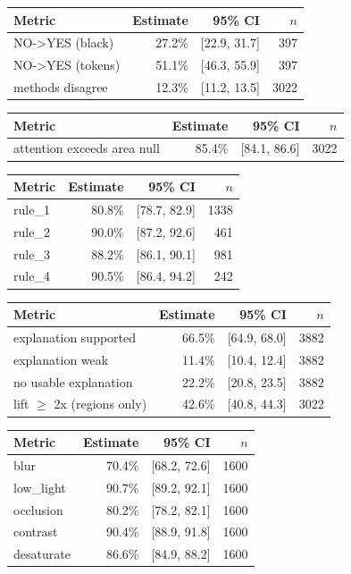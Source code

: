 \begin{tabular}{lrrr}
\toprule
Metric & Estimate & 95\% CI & $n$ \\
\midrule
NO->YES (black) & 27.2\% & [22.9, 31.7] & 397 \\
NO->YES (tokens) & 51.1\% & [46.3, 55.9] & 397 \\
methods disagree & 12.3\% & [11.2, 13.5] & 3022 \\
\bottomrule
\end{tabular}

\begin{tabular}{lrrr}
\toprule
Metric & Estimate & 95\% CI & $n$ \\
\midrule
attention exceeds area null & 85.4\% & [84.1, 86.6] & 3022 \\
\bottomrule
\end{tabular}

\begin{tabular}{lrrr}
\toprule
Metric & Estimate & 95\% CI & $n$ \\
\midrule
rule\_1 & 80.8\% & [78.7, 82.9] & 1338 \\
rule\_2 & 90.0\% & [87.2, 92.6] & 461 \\
rule\_3 & 88.2\% & [86.1, 90.1] & 981 \\
rule\_4 & 90.5\% & [86.4, 94.2] & 242 \\
\bottomrule
\end{tabular}

\begin{tabular}{lrrr}
\toprule
Metric & Estimate & 95\% CI & $n$ \\
\midrule
explanation supported & 66.5\% & [64.9, 68.0] & 3882 \\
explanation weak & 11.4\% & [10.4, 12.4] & 3882 \\
no usable explanation & 22.2\% & [20.8, 23.5] & 3882 \\
lift $\geq$ 2x (regions only) & 42.6\% & [40.8, 44.3] & 3022 \\
\bottomrule
\end{tabular}

\begin{tabular}{lrrr}
\toprule
Metric & Estimate & 95\% CI & $n$ \\
\midrule
blur & 70.4\% & [68.2, 72.6] & 1600 \\
low\_light & 90.7\% & [89.2, 92.1] & 1600 \\
occlusion & 80.2\% & [78.2, 82.1] & 1600 \\
contrast & 90.4\% & [88.9, 91.8] & 1600 \\
desaturate & 86.6\% & [84.9, 88.2] & 1600 \\
\bottomrule
\end{tabular}


